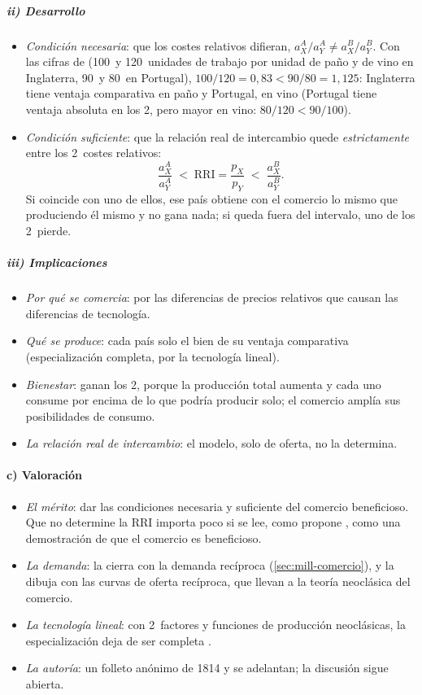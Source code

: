 \documentclass[11pt]{article}
\begin{document}
\subparagraph{ii) Desarrollo}
\begin{itemize}
\item \emph{Condición necesaria}: que los costes relativos difieran, $a_X^A/a_Y^A\neq a_X^B/a_Y^B$. Con las cifras de  (100~y 120~unidades de trabajo por unidad de paño y de vino en Inglaterra, 90~y 80~en Portugal), $100/120=0{,}83<90/80=1{,}125$: Inglaterra tiene ventaja comparativa en paño y Portugal, en vino (Portugal tiene ventaja absoluta en los 2, pero mayor en vino: $80/120<90/100$).
\item \emph{Condición suficiente}: que la relación real de intercambio quede \emph{estrictamente} entre los 2~costes relativos:
  \begin{equation}\label{eq:ventaja-comparativa}
  \frac{a_X^A}{a_Y^A}\;<\;\mathrm{RRI}=\frac{p_X}{p_Y}\;<\;\frac{a_X^B}{a_Y^B}.
  \end{equation}
  Si coincide con uno de ellos, ese país obtiene con el comercio lo mismo que produciendo él mismo y no gana nada; si queda fuera del intervalo, uno de los 2~pierde.
\end{itemize}

\subparagraph{iii) Implicaciones}
\begin{itemize}
\item \emph{Por qué se comercia}: por las diferencias de precios relativos que causan las diferencias de tecnología.
\item \emph{Qué se produce}: cada país solo el bien de su ventaja comparativa (especialización completa, por la tecnología lineal).
\item \emph{Bienestar}: ganan los 2, porque la producción total aumenta y cada uno consume por encima de lo que podría producir solo; el comercio amplía sus posibilidades de consumo.
\item \emph{La relación real de intercambio}: el modelo, solo de oferta, no la determina.
\end{itemize}

\paragraph{c) Valoración}
\begin{itemize}
\item \emph{El mérito}: dar las condiciones necesaria y suficiente del comercio beneficioso. Que no determine la RRI importa poco si se lee, como propone \textcite{Bhagwati1964Pure}, como una demostración de que el comercio es beneficioso.
\item \emph{La demanda}: la cierra \textcite{Mill1844Essays} con la demanda recíproca (\ref{sec:mill-comercio}), y \textcite{Marshall1879Pure} la dibuja con las curvas de oferta recíproca, que llevan a la teoría neoclásica del comercio.
\item \emph{La tecnología lineal}: con 2~factores y funciones de producción neoclásicas, la especialización deja de ser completa .
\item \emph{La autoría}: un folleto anónimo de 1814 y \textcite{Torrens1815Essay} se adelantan; la discusión sigue abierta\nocite{GrancayGrancay2015Considerations,Ruffin2002Ricardo}.
\end{itemize}
\end{document}
